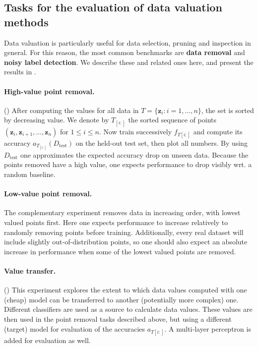 \documentclass[10pt]{article}
\newcommand{\tmdfn}[1]{\textbf{#1}}
\newcommand{\tmmathbf}[1]{\ensuremath{\boldsymbol{#1}}}
\newcommand{\tmop}[1]{\ensuremath{\operatorname{#1}}}
\begin{document}
\subsection{Tasks for the evaluation of data valuation
methods}\label{sec:evaluation-data-val}

Data valuation is particularly useful for data selection, pruning and
inspection in general. For this reason, the most common benchmarks are
{\tmdfn{data removal}} and {\tmdfn{noisy label detection}}. We describe these
and related ones here, and present the results in .

\paragraph{High-value point removal.}() After computing
the values for all data in $T = \{ \tmmathbf{z}_i : i = 1, \ldots, n \}$, the
set is sorted by decreasing value. We denote by $T_{[i :]}$ the sorted
sequence of points $(\tmmathbf{z}_i, \tmmathbf{z}_{i + 1}, \ldots,
\tmmathbf{z}_n)$ for $1 \leqslant i \leqslant n$. Now train successively $f_{T
[i :]}$ and compute its accuracy $a_{T_{[i :]}} (D_{\tmop{test}})$ on the
held-out test set, then plot all numbers. By using $D_{\tmop{test}}$ one
approximates the expected accuracy drop on unseen data. Because the points
removed have a high value, one expects performance to drop visibly wrt. a
random baseline.

\paragraph{Low-value point removal.} The complementary experiment removes data
in increasing order, with lowest valued points first. Here one expects
performance to increase relatively to randomly removing points before
training. Additionally, every real dataset will include slightly
out-of-distribution points, so one should also expect an absolute increase in
performance when some of the lowest valued points are removed.

\paragraph{Value transfer.}() This experiment
explores the extent to which data values computed with one (cheap) model can
be transferred to another (potentially more complex) one. Different
classifiers are used as a source to calculate data values. These values are
then used in the point removal tasks described above, but using a different
(target) model for evaluation of the accuracies $a_{T [i :]}$. A multi-layer
perceptron is added for evaluation as well.
\end{document}
